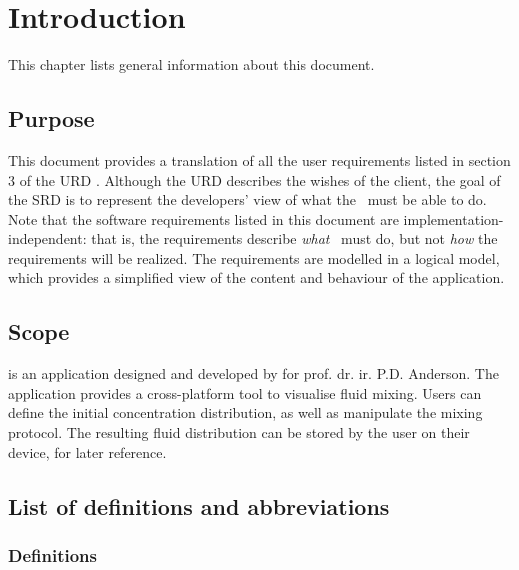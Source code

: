 \chapter{Introduction}
This chapter lists general information about this document.

\section{Purpose}
This document provides a translation of all the user requirements listed in section 3 of the URD \cite{urd}. Although the URD describes the wishes of the client, the goal of the SRD is to represent the developers' view of what the \applicationname\ must be able to do. \\
Note that the software requirements listed in this document are implementation-independent: that is, the requirements describe \emph{what} \projectname\ must do, but not \emph{how} the requirements will be realized. The requirements are modelled in a logical model, which provides a simplified view of the content and behaviour of the application.

\section{Scope}
\projectname{} is an application designed and developed by \projectauthor{} for prof. dr. ir. P.D. Anderson. The application provides a cross-platform tool to visualise fluid mixing. Users can define the initial concentration distribution, as well as manipulate the mixing protocol. The resulting fluid distribution can be stored by the user on their device, for later reference.

\section{List of definitions and abbreviations}

\subsection{Definitions}

